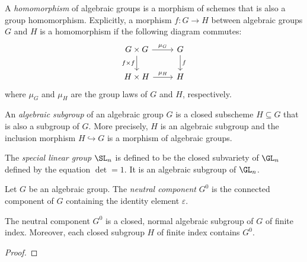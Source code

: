     \begin{definition}\label{def:homomorphism_of_algebraic_groups}
        A \emph{homomorphism} of algebraic groups is a morphism of schemes that is also a group homomorphism.
        Explicitly, a morphism \(f: G \to H\) between algebraic groups \(G\) and \(H\) is a homomorphism if the following diagram commutes:
        \[
            \begin{tikzcd}
                G \times G \arrow{r}{\mu_G} \arrow[d, "f\times f" swap] & G \arrow{d}{f} \\
                H \times H \arrow{r}{\mu_H} & H
            \end{tikzcd}
        \]
        where \(\mu_G\) and \(\mu_H\) are the group laws of \(G\) and \(H\), respectively.
    \end{definition}

    \begin{definition}\label{def:algebraic_subgroup}
        An \emph{algebraic subgroup} of an algebraic group \(G\) is a closed subscheme \(H \subseteq G\) that is also a subgroup of \(G\).
        More precisely, \(H\) is an algebraic subgroup and the inclusion morphism \(H \hookrightarrow G\) is a morphism of algebraic groups.
    \end{definition}

    \begin{example}\label{eg:special_linear_group}
        The \emph{special linear group} $\SL_n$ is defined to be the closed subvariety of $\GL_n$ defined by the equation \(\det = 1\).
        It is an algebraic subgroup of \(\GL_n\).
    \end{example}

    \begin{definition}\label{def:neutral_component}
        Let \(G\) be an algebraic group.
        The \emph{neutral component} \(G^0\) is the connected component of \(G\) containing the identity element \(\varepsilon\).
    \end{definition}

    \begin{proposition}\label{prop:neutral_component_is_subgroup}
        The neutral component \(G^0\) is a closed, normal algebraic subgroup of \(G\) of finite index.
        Moreover, each closed subgroup \(H\) of finite index contains \(G^0\).
    \end{proposition}
    \begin{proof}
    \end{proof}

